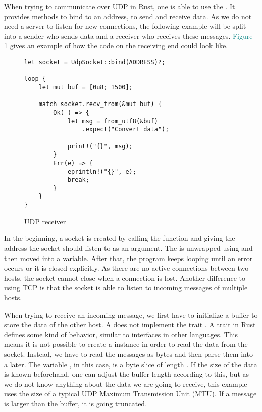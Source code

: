 When trying to communicate over UDP in Rust, one is able to use the  . It
provides methods to bind to an address, to send and receive data. As we do not need a server to listen for new
connections, the following example will be split into a sender who sends data and a receiver who receives these
messages. \textcolor{teal}{Figure \ref{udp-receiver}} gives an example of how the code on the receiving end could look
like.

\begin{figure}[ht]
    \begin{verbatim}
let socket = UdpSocket::bind(ADDRESS)?;

loop {
    let mut buf = [0u8; 1500];

    match socket.recv_from(&mut buf) {
        Ok(_) => {
            let msg = from_utf8(&buf)
                .expect("Convert data");

            print!("{}", msg);
        }
        Err(e) => {
            eprintln!("{}", e);
            break;
        }
    }
}
    \end{verbatim}
    \caption{UDP receiver}
    \label{udp-receiver}
\end{figure}

In the beginning, a socket is created by calling the  function and giving the address the socket should
listen to as an argument. The  is unwrapped using  and then moved into a variable. After that, the
program keeps looping until an error occurs or it is closed explicitly. As there are no active connections between two
hosts, the socket cannot close when a connection is lost. Another difference to using TCP is that the socket is able to
listen to incoming messages of multiple hosts.

When trying to receive an incoming message, we first have to initialize a buffer to store the data of the other host.
A  does not implement the trait . A trait in Rust defines some kind of behavior,
similar to interfaces in other languages. This means it is not possible to create a  instance in order
to read the data from the socket. Instead, we have to read the messages as bytes and then parse them into a
 later. The variable , in this case, is a byte slice of length . If the size of the
data is known beforehand, one can adjust the buffer length according to this, but as we do not know anything about the
data we are going to receive, this example uses the size of a typical UDP Maximum Transmission Unit (MTU). If a message
is larger than the buffer, it is going truncated.


